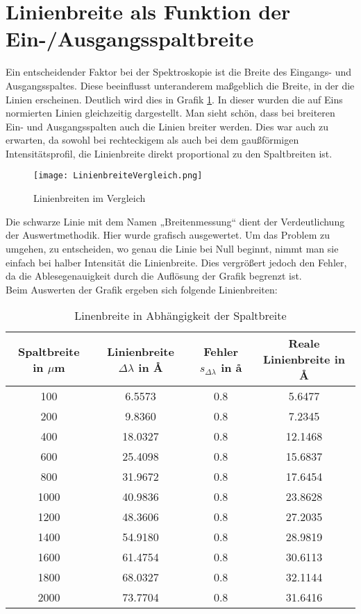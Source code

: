 \section{Linienbreite als Funktion der Ein-/Ausgangsspaltbreite}

Ein entscheidender Faktor bei der Spektroskopie ist die Breite des Eingangs- und Ausgangsspaltes. Diese beeinflusst unteranderem maßgeblich die Breite, 
in der die Linien erscheinen. Deutlich wird dies in Grafik \ref{LinVergleich}. In dieser wurden die auf Eins normierten Linien gleichzeitig dargestellt. 
Man sieht schön, dass bei breiteren Ein- und Ausgangsspalten auch die Linien breiter werden. Dies war auch zu erwarten, da sowohl bei rechteckigem als auch bei 
dem gaußförmigen Intensitätsprofil, die Linienbreite direkt proportional zu den Spaltbreiten ist.
\begin{figure}[h]
    \centering
    \texttt{[image: LinienbreiteVergleich.png]}
    \caption{Linienbreiten im Vergleich}
    \label{LinVergleich}
\end{figure}
Die schwarze Linie mit dem Namen „Breitenmessung“ dient der Verdeutlichung der Auswertmethodik. Hier wurde grafisch ausgewertet. Um das Problem zu umgehen, 
zu entscheiden, wo genau die Linie bei Null beginnt, nimmt man sie einfach bei halber Intensität die Linienbreite. 
Dies vergrößert jedoch den Fehler, da die Ablesegenauigkeit durch die Auflösung der Grafik begrenzt ist.\\
Beim Auswerten der Grafik ergeben sich folgende Linienbreiten:
\begin{table}[h]
    \centering
    \begin{tabular}[h]{c|c|c|c}
        Spaltbreite in $\mu$m & Linienbreite $\Delta \lambda $ in \r{A} & Fehler $s_{\Delta \lambda }$ in \r{a}& Reale Linienbreite in \r{A}\\
        \hline
        100 & 6.5573 & 0.8 & 5.6477\\
        200 & 9.8360 & 0.8 & 7.2345\\
        400 & 18.0327 & 0.8 & 12.1468\\
        600 & 25.4098 & 0.8 & 15.6837\\
        800 & 31.9672 & 0.8 & 17.6454\\
        1000 & 40.9836 & 0.8 & 23.8628\\
        1200 & 48.3606 & 0.8 & 27.2035\\
        1400 & 54.9180 & 0.8 & 28.9819\\
        1600 & 61.4754 & 0.8 & 30.6113\\
        1800 & 68.0327 & 0.8 & 32.1144\\
        2000 & 73.7704 & 0.8 & 31.6416\\

    \end{tabular}
    \caption{Linenbreite in Abhängigkeit der Spaltbreite}
\end{table}
